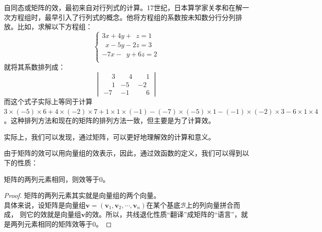 \documentclass[12pt,UTF8,fontset=none]{ctexbook}
\begin{document}
自同态或矩阵的效，最初来自对行列式的计算。17世纪，日本算学家关孝和在解一次方程组时，最早引入了行列式的概念。他将方程组的系数按未知数分行分列排放。比如，求解以下方程组：
$$
\left\{
    \begin{aligned}
        3 x + 4 y + \phantom{2}z = 1 \\
        \phantom{2} x - 5 y - 2z = 3 \\
        -7 x - \phantom{2}y + 6z = 2 \\
    \end{aligned}
\right.
$$
就将其系数排列成：
$$
\begin{vmatrix}
    \phantom{-}3 & \phantom{-}4 & \phantom{-}1 \\
    \phantom{-}1 & -5 & -2 \\
    -7 & -1 & \phantom{-}6
\end{vmatrix}
$$
而这个式子实际上等同于计算$3\times(-5)\times6+4\times(-2)\times 7 + 1\times 1\times(-1) - (-7)\times(-5)\times 1 - (-1)\times(-2)\times 3 - 6\times 1\times 4$。这种排列方法和现在的矩阵的排列方法一致，但主要是为了计算效。

实际上，我们可以发现，通过矩阵，可以更好地理解效的计算和意义。

由于矩阵的效可以用向量组的效表示，因此，通过效函数的定义，我们可以得到以下的性质：
\begin{pp}\label{pp:10_36}
    矩阵的两列元素相同，则效等于$0$。
\end{pp}
\begin{proof} %
    矩阵的两列元素其实就是向量组的两个向量。\\
    具体来说，设矩阵是向量组$\mathbf{v} = (\mathbf{v}_1, \mathbf{v}_2, \cdots , \mathbf{v}_n)$在某个基底$\mathcal{B}$上的列向量拼合而成，
    则它的效就是向量组$\mathbf{v}$的效。所以，共线退化性质“翻译”成矩阵的“语言”，就是两列元素相同的矩阵效等于$0$。
\end{proof}
\end{document}
